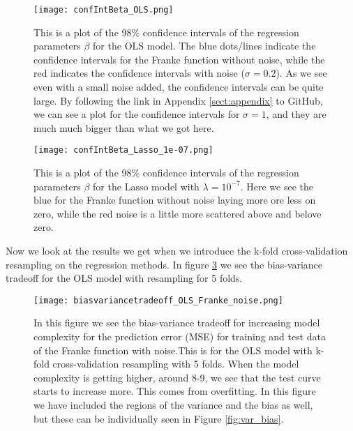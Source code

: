 \documentclass[12pt,a4paper,english]{article}
\begin{document}
\begin{figure}[htbp]
	\centering\texttt{[image: confIntBeta\_OLS.png]}
	\caption{This is a plot of the 98\% confidence intervals of the regression parameters $\beta$ for the OLS model. The blue dots/lines indicate the confidence intervals for the Franke function without noise, while the red indicates the confidence intervals with noise ($\sigma=0.2$). As we see even with a small noise added, the confidence intervals can be quite large. By following the link in Appendix \ref{sect:appendix} to GitHub, we can see a plot for the confidence intervals for $\sigma=1$, and they are much much bigger than what we got here.\label{fig:conf_int_OLS}}
\end{figure} 

\begin{figure}[htbp]
	\centering\texttt{[image: confIntBeta\_Lasso\_1e-07.png]}
	\caption{This is a plot of the 98\% confidence intervals of the regression parameters $\beta$ for the Lasso model with $\lambda=10^{-7}$. Here we see the blue for the Franke function without noise laying more ore less on zero, while the red noise is a little more scattered above and belove zero.\label{fig:conf_int_Lasso}}
\end{figure} 

Now we look at the results we get when we introduce the k-fold cross-validation resampling on the regression methods. In figure \ref{fig:biasvar_OLS} we see the bias-variance tradeoff for the OLS model with resampling for 5 folds.

\begin{figure}[htbp]
	\centering\texttt{[image: biasvariancetradeoff\_OLS\_Franke\_noise.png]}
	\caption{In this figure we see the bias-variance tradeoff for increasing model complexity for the prediction error (MSE) for training and test data of the Franke function with noise.This is for the OLS model with k-fold cross-validation resampling with 5 folds. When the model complexity is getting higher, around 8-9, we see that the test curve starts to increase more. This comes from overfitting. In this figure we have included the regions of the variance and the bias as well, but these can be individually seen in Figure \ref{fig:var_bias}.\label{fig:biasvar_OLS}}
\end{figure} 
\end{document}
